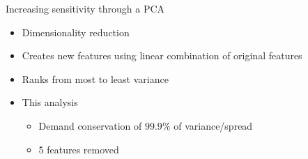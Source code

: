 \documentclass[UKenglish]{beamer}
\begin{document}
\begin{frame}{Increasing sensitivity through a PCA}
        \begin{itemize}
            \item Dimensionality reduction
            \item Creates new features using linear combination of original features
            \item Ranks from most to least variance
            \item This analysis
            \begin{itemize}
                \item Demand conservation of $99.9\%$ of variance/spread
                \item 5 features removed
            \end{itemize}
        \end{itemize}
\end{frame}
\end{document}
